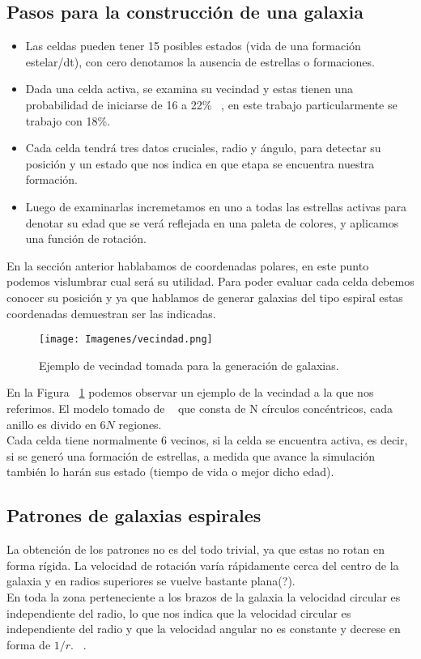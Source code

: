 \documentclass[12tp]{article}
\begin{document}
\subsection{Pasos para la construcción de una galaxia}
\begin{itemize}
    \item Las celdas pueden tener 15 posibles estados (vida de una formación estelar/dt), con cero denotamos la 
    ausencia de estrellas o formaciones.
    \item Dada una celda activa, se examina su vecindad y estas tienen una probabilidad de iniciarse de 16 a 22\% ~\cite{kent}, en este
    trabajo particularmente se trabajo con 18\%.
    \item Cada celda tendrá tres datos cruciales, radio y ángulo, para detectar su posición y un estado que nos indica en que
    etapa se encuentra nuestra formación.
    \item Luego de examinarlas incremetamos en uno a todas las estrellas activas para denotar su edad que se verá reflejada en
    una paleta de colores, y aplicamos una función de rotación.  
\end{itemize}
En la sección anterior hablabamos de coordenadas polares, en este punto podemos vislumbrar cual será su utilidad.
Para poder evaluar cada celda debemos conocer su posición y ya que hablamos de generar galaxias del tipo espiral estas coordenadas
demuestran ser las indicadas.
    \begin{figure}
        \begin{center}
            \texttt{[image: Imagenes/vecindad.png]}
        \caption{Ejemplo de vecindad tomada para la generación de galaxias.}
         \label{fig:vecindad}
    \end{center}
    \end{figure}

En la Figura ~\ref{fig:vecindad} podemos observar un ejemplo de la vecindad a la que nos referimos.
El modelo tomado de ~\cite{Schulman} que consta de N círculos concéntricos, cada anillo es divido en $6N$ regiones.\\
Cada celda tiene normalmente 6 vecinos, si la celda se encuentra activa, es decir, si se generó una formación de estrellas,
a medida que avance la simulación también lo harán sus estado (tiempo de vida o mejor dicho edad).\\[0.2cm]

\subsection{Patrones de galaxias espirales}
La obtención de los patrones no es  del todo trivial, ya que estas no rotan en forma rígida.
La velocidad de rotación varía rápidamente cerca del centro de la galaxia y en radios superiores se vuelve bastante 
plana(?).\\[0.2cm] En toda la zona perteneciente a los brazos de la galaxia la velocidad circular es independiente del radio, lo que nos indica 
que la velocidad circular es independiente del radio y que la velocidad angular no es constante y decrese en forma de $1/r$.
~\cite{Schulman}.
\end{document}
